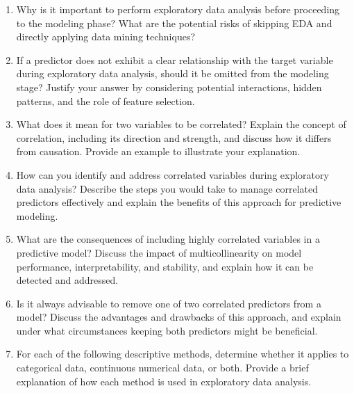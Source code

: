 \documentclass[
  11pt,
]{book}
\theoremstyle{definition}
\theoremstyle{definition}
\theoremstyle{definition}
\theoremstyle{definition}
\theoremstyle{remark}
\begin{document}
\begin{enumerate}
\def\labelenumi{\arabic{enumi}.}
\item
  Why is it important to perform exploratory data analysis before proceeding to the modeling phase? What are the potential risks of skipping EDA and directly applying data mining techniques?
\item
  If a predictor does not exhibit a clear relationship with the target variable during exploratory data analysis, should it be omitted from the modeling stage? Justify your answer by considering potential interactions, hidden patterns, and the role of feature selection.
\item
  What does it mean for two variables to be correlated? Explain the concept of correlation, including its direction and strength, and discuss how it differs from causation. Provide an example to illustrate your explanation.
\item
  How can you identify and address correlated variables during exploratory data analysis? Describe the steps you would take to manage correlated predictors effectively and explain the benefits of this approach for predictive modeling.
\item
  What are the consequences of including highly correlated variables in a predictive model? Discuss the impact of multicollinearity on model performance, interpretability, and stability, and explain how it can be detected and addressed.
\item
  Is it always advisable to remove one of two correlated predictors from a model? Discuss the advantages and drawbacks of this approach, and explain under what circumstances keeping both predictors might be beneficial.
\item
  For each of the following descriptive methods, determine whether it applies to categorical data, continuous numerical data, or both. Provide a brief explanation of how each method is used in exploratory data analysis.


\end{enumerate}
\end{document}
